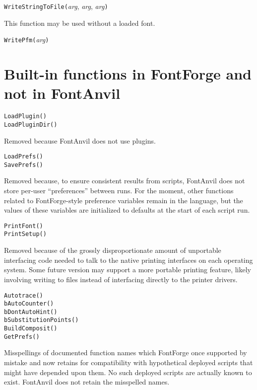 \texttt{WriteStringToFile(}\textit{arg}, \textit{arg}, \textit{arg}\texttt{)}

This function may be used without a loaded font.



\texttt{WritePfm(}\textit{arg}\texttt{)}


\section{Built-in functions in FontForge and not in FontAnvil}

\texttt{LoadPlugin()}\FFdiff\\
\texttt{LoadPluginDir()}

Removed because FontAnvil does not use plugins.

\noindent
\texttt{LoadPrefs()}\FFdiff\\
\texttt{SavePrefs()}

Removed because, to ensure consistent results from scripts, FontAnvil does
not store per-user ``preferences'' between runs.  For the moment, other
functions related to FontForge-style preference variables remain in the
language, but the values of these variables are initialized to defaults at
the start of each script run.

\noindent
\texttt{PrintFont()}\FFdiff\\
\texttt{PrintSetup()}

Removed because of the grossly disproportionate amount of unportable
interfacing code needed to talk to the native printing interfaces on each
operating system.  Some future version may support a more portable printing
feature, likely involving writing to files instead of interfacing directly
to the printer drivers.

\noindent
\texttt{Autotrace()}\FFdiff\\
\texttt{bAutoCounter()}\\
\texttt{bDontAutoHint()}\\
\texttt{bSubstitutionPoints()}\\
\texttt{BuildComposit()}\\
\texttt{GetPrefs()}

Misspellings of documented function names which FontForge once supported by
mistake and now retains for compatibility with hypothetical deployed
scripts that might have depended upon them.  No such deployed scripts are
actually known to exist.  FontAnvil does not retain the misspelled names.


